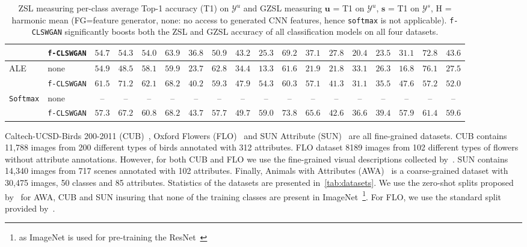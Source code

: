 \documentclass[10pt,twocolumn,letterpaper]{article}
\newcommand{\myparagraph}[1]{\vspace{6pt}\noindent{\bf #1}}
\begin{document}
{\begin{table*}[t]
{\begin{tabular}{l l c c c c |c c c |c c c |c c c | c c c  }
     & \texttt{f-CLSWGAN} & $54.7$ & $54.3$  & $54.0$ & $63.9$ & $36.8$ & $50.9$ & $43.2$ & $25.3$ & $69.2$ & $37.1$ &  $27.8$ & $20.4$ & $23.5$ & $31.1$ & $72.8$ & $43.6$ \\
     \hline 
     \multirow{2}{*}{ALE~\cite{APHS15}} & none & $54.9$ & $48.5$ & $58.1$ & $59.9$
     & $23.7$ & $62.8$ & $34.4$ & $13.3$ & $61.6$ & $21.9$ & $21.8$ & $33.1$ & $26.3$ & $16.8$ & $76.1$ & $27.5$ \\
     & \texttt{f-CLSWGAN} & $\mathbf{61.5}$ & $\mathbf{71.2}$ & $\mathbf{62.1}$ & $68.2$ & $40.2$& $59.3$ & $47.9$ & $54.3$ & $60.3$ & $57.1$ & $41.3$ & $31.1$ & $35.5$ & $47.6$ & $57.2$ & $52.0$ \\
     \hline
     \multirow{2}{*}{\texttt{Softmax}} & none & --  & --  & -- & -- & -- & -- & -- & -- & -- & -- & -- & -- & -- & -- & -- & -- \\
     & \texttt{f-CLSWGAN} & $57.3$ & $67.2$ & $60.8$ & $68.2$ & $43.7$ & $57.7$ & $\mathbf{49.7}$ & $59.0$ & $73.8$ & $\mathbf{65.6}$ &  $42.6$ & $36.6$ & $\mathbf{39.4}$ & $57.9$ & $61.4$ & $\mathbf{59.6}$ \\    
\end{tabular}
   }
\caption{ZSL measuring per-class average Top-1 accuracy (T1) on $\mathcal{Y}^{u}$ and GZSL measuring $\mathbf{u}$ = T1 on $\mathcal{Y}^{u}$, $\mathbf{s}$ = T1 on $\mathcal{Y}^{s}$, H = harmonic mean (FG=feature generator, none: no access to generated CNN features, hence \texttt{softmax} is not applicable). \texttt{f-CLSWGAN} significantly boosts both the ZSL and GZSL accuracy of all classification models on all four datasets. }
\label{tab:all}
\end{table*}
}



\myparagraph{Datasets.} Caltech-UCSD-Birds 200-2011 (CUB)~\cite{CaltechUCSDBirdsDataset}, Oxford Flowers (FLO)~\cite{OxfordFlowersDataset} and SUN Attribute (SUN)~\cite{PH12} are all fine-grained datasets. CUB contains 11,788 images from 200 different types of birds annotated with 312 attributes. FLO dataset 8189 images from 102 different types of flowers without attribute annotations. However, for both CUB and FLO we use the fine-grained visual descriptions collected by~\cite{RALS16}. SUN contains 14,340 images from 717 scenes annotated with 102 attributes. Finally,  Animals with Attributes (AWA)~\cite{LNH13} is a coarse-grained dataset with 30,475 images, 50 classes and 85 attributes. Statistics of the datasets are presented in~\autoref{tab:datasets}. We use the zero-shot splits proposed by~\cite{XSA17} for AWA, CUB and SUN insuring that none of the training classes are present in ImageNet~\cite{ImageNet}\footnote{as ImageNet is used for pre-training the ResNet~\cite{HZRS15}}. For FLO, we use the standard split provided by~\cite{RALS16}. 
\end{document}
